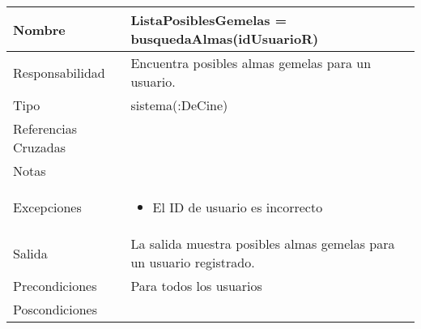 \documentclass{article}
\begin{document}
\begin{table}[h]
\begin{tabular}{|l|l|l|l|l|l|}
\hline
\multicolumn{2}{|p{3cm}|}{Nombre} & \multicolumn{4}{p{10cm}|}{\textbf{ListaPosiblesGemelas = busquedaAlmas(idUsuarioR)}}\\
\hline
\multicolumn{2}{|p{3cm}|}{Responsabilidad} & \multicolumn{4}{p{10cm}|}{Encuentra posibles almas gemelas para un usuario.} \\
\hline
\multicolumn{2}{|p{3cm}|}{Tipo} & \multicolumn{4}{p{10cm}|}{sistema(:DeCine)} \\
\hline
\multicolumn{2}{|p{3cm}|}{Referencias Cruzadas} & \multicolumn{4}{p{10cm}|}{} \\
\hline
\multicolumn{2}{|p{3cm}|}{Notas} & \multicolumn{4}{p{10cm}|}{} \\
\hline
\multicolumn{2}{|p{3cm}|}{Excepciones} & \multicolumn{4}{p{10cm}|}{\begin{itemize}
\item El ID de usuario es incorrecto 
\end{itemize}} \\
\hline
\multicolumn{2}{|p{3cm}|}{Salida} & \multicolumn{4}{p{10cm}|}{La salida muestra posibles almas gemelas para un usuario registrado.} \\
\hline
\multicolumn{2}{|p{3cm}|}{Precondiciones} & \multicolumn{4}{p{10cm}|}{Para todos los usuarios} \\
\hline
\multicolumn{2}{|p{3cm}|}{Poscondiciones} & \multicolumn{4}{p{10cm}|}{} \\
\hline
\end{tabular}
\end{table}

\clearpage
\pagebreak
\end{document}
